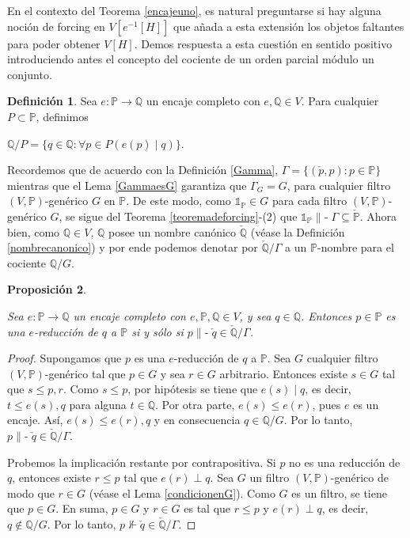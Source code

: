 \documentclass[11pt]{unam_tesis1}
\theoremstyle{MyThmStyle}
\theoremstyle{definition}
\newtheorem{definition}{Definici\'on}[chapter]
\theoremstyle{plain}
\newtheorem{proposition}[definition]{Proposici\'on}
\theoremstyle{remark}
\def\forces{\mathop{\parallel\!\!\!-}\nolimits}
\let\Vdash\forces
\let\leq\leqslant
\begin{document}
En el contexto del Teorema \ref{encajeuno}, es natural preguntarse si hay alguna noci\'on de forcing en $V[e^{-1}[H]]$ que a\~nada a esta extensi\'on los objetos faltantes para poder obtener $V[H]$. Demos respuesta a esta cuesti\'on en sentido positivo introduciendo antes el concepto del cociente de un orden parcial m\'odulo un conjunto.

\begin{definition}
Sea $e:\mathbb P\rightarrow \mathbb Q$ un encaje completo con $e,\mathbb Q\in V$. Para cualquier $P\subset \mathbb P$, definimos

\begin{center}\label{moduloG}
$\mathbb Q/P=\{q\in \mathbb Q: \forall p\in P(e(p)\mid q)\}$.
\end{center}

\end{definition}

Recordemos que de acuerdo con la Definici\'on \ref{Gamma}, $\Gamma=\{(\check{p},p):p\in \mathbb P \}$ mientras que el Lema \ref{GammaesG} garantiza que $\Gamma_G=G$, para cualquier filtro $(V,\mathbb P)$-gen\'erico $G$ en $\mathbb P$. De este modo, como $\mathds 1_{\mathbb P}\in G$ para cada filtro $(V,\mathbb P)$-gen\'erico $G$, se sigue del Teorema \ref{teoremadeforcing}-(2) que $\mathds 1_{\mathbb P}\Vdash \Gamma\subseteq \check{\mathbb P}$. Ahora bien, como $\mathbb Q\in V$, $\mathbb Q$ posee un nombre can\'onico $\check {\mathbb Q}$ (v\'ease la Definici\'on \ref{nombrecanonico}) y por ende podemos denotar por $\check {\mathbb Q}/\Gamma$ a un $\mathbb P$-nombre para el cociente $\mathbb Q/G$.

\begin{proposition}\label{reduccion}

Sea $e:\mathbb P \rightarrow \mathbb Q$ un encaje completo con $e,\mathbb P,\mathbb Q\in V$, y sea $q\in \mathbb Q$. Entonces $p\in \mathbb P$ es una $e$-reducci\'on de $q$ a $\mathbb P$ si y s\'olo si $p\Vdash \check{q}\in \check{\mathbb Q}/\Gamma$.

\end{proposition}

\begin{proof}
Supongamos que $p$ es una $e$-reducci\'on de $q$ a $\mathbb P$. Sea $G$ cualquier filtro $(V,\mathbb P)$-gen\'erico tal que $p\in G$ y sea $r\in G$ arbitrario. Entonces existe $s\in G$ tal que $s\leq p,r$. Como $s\leq p$, por hip\'otesis se tiene que $e(s)\mid q$, es decir, $t\leq e(s), q$ para alguna $t\in \mathbb Q$. Por otra parte, $e(s)\leq e(r)$, pues $e$ es un encaje. As\'i, $e(s)\leq e(r),q$ y en consecuencia $q \in \mathbb Q/G$. Por lo tanto, $p\Vdash \check{q}\in \check{\mathbb Q}/\Gamma$.

Probemos la implicaci\'on restante por contrapositiva. Si $p$ no es una reducci\'on de $q$, entonces existe $r\leq p$ tal que $e(r)\perp q$. Sea $G$ un filtro $(V, \mathbb P)$-gen\'erico de modo que $r\in G$ (v\'ease el Lema \ref{condicionenG}). Como $G$ es un filtro, se tiene que $p\in G$. En suma, $p\in G$ y $r\in G$ es tal que $r\leq p$ y $e(r)\perp q$, es decir, $q \notin \mathbb Q/G$. Por lo tanto, $p\nVdash \check{q}\in \mathbb {\check{Q}}/\Gamma$. 
\end{proof}
\end{document}
